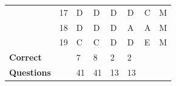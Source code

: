 \documentclass[pageno]{final_paper}
\begin{document}
\begin{table}[]
\begin{tabularx}{\textwidth}{lXXXXXXX}
\textbf{}                & 17              & D                       & D                      & D                       & D                       & C                       & M                   \\
\textbf{}                & 18              & D                       & D                      & D                       & A                       & A                       & M                   \\
\textbf{}                & 19              & C                       & C                      & D                       & D                       & E                       & M                   \\ \midrule
\textbf{Correct}         &                 & 7                       & 8                      & 2                       & 2                       &                         &                     \\
\textbf{Questions}       &                 & 41                      & 41                     & 13                      & 13                      &                         &                     \\ \bottomrule
\end{tabularx}
\end{table}
\end{document}
